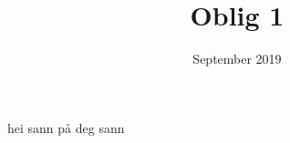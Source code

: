 \documentclass{article}
\title{Oblig 1}
\date{September 2019}
\begin{document}
\maketitle

hei sann på deg sann
    
\end{document}
